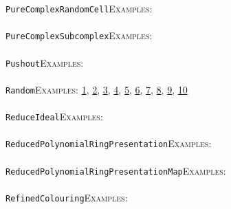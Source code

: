 \documentclass[a4paper,11pt]{report}
\begin{document}
{{ \texttt{PureComplexRandomCell}{\nobreakspace}{\nobreakspace}{\nobreakspace}{\nobreakspace}\textsc{Examples:} \\
 \\
 \texttt{PureComplexSubcomplex}{\nobreakspace}{\nobreakspace}{\nobreakspace}{\nobreakspace}\textsc{Examples:} \\
 \\
 \texttt{Pushout}{\nobreakspace}{\nobreakspace}{\nobreakspace}{\nobreakspace}\textsc{Examples:} \\
 \\
 \texttt{Random}{\nobreakspace}{\nobreakspace}{\nobreakspace}{\nobreakspace}\textsc{Examples:} \href{../www/SideLinks/About/aboutLinks.html} {1}{\nobreakspace}, \href{../www/SideLinks/About/aboutParallel.html} {2}{\nobreakspace}, \href{../www/SideLinks/About/aboutCocycles.html} {3}{\nobreakspace}, \href{../www/SideLinks/About/aboutQuandles2.html} {4}{\nobreakspace}, \href{../www/SideLinks/About/aboutQuandles.html} {5}{\nobreakspace}, \href{../www/SideLinks/About/aboutCubical.html} {6}{\nobreakspace}, \href{../www/SideLinks/About/aboutRandomComplexes.html} {7}{\nobreakspace}, \href{../www/SideLinks/About/aboutFunctorial.html} {8}{\nobreakspace}, \href{../www/SideLinks/About/aboutKnots.html} {9}{\nobreakspace}, \href{../www/SideLinks/About/aboutKnotsQuandles.html} {10}{\nobreakspace} \\
 \\
 \texttt{ReduceIdeal}{\nobreakspace}{\nobreakspace}{\nobreakspace}{\nobreakspace}\textsc{Examples:} \\
 \\
 \texttt{ReducedPolynomialRingPresentation}{\nobreakspace}{\nobreakspace}{\nobreakspace}{\nobreakspace}\textsc{Examples:} \\
 \\
 \texttt{ReducedPolynomialRingPresentationMap}{\nobreakspace}{\nobreakspace}{\nobreakspace}{\nobreakspace}\textsc{Examples:} \\
 \\
 \texttt{RefinedColouring}{\nobreakspace}{\nobreakspace}{\nobreakspace}{\nobreakspace}\textsc{Examples:} \\
 \\
}}
\end{document}
